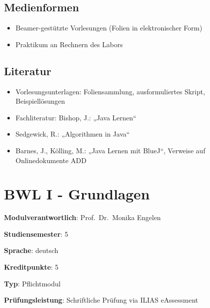 \hypertarget{medienformenpathlabelmi-2017modulbeschreibungen-bachelorba_algorithmenundprogrammierung2}{%
\section*{Medienformen\label{/mi-2017/modulbeschreibungen-bachelor/BA_AlgorithmenundProgrammierung2}}\label{medienformenpathlabelmi-2017modulbeschreibungen-bachelorba_algorithmenundprogrammierung2}}

\begin{itemize}
\tightlist
\item
  Beamer-gestützte Vorlesungen (Folien in elektronischer Form)
\item
  Praktikum an Rechnern des Labors
\end{itemize}

\hypertarget{literaturpathlabelmi-2017modulbeschreibungen-bachelorba_algorithmenundprogrammierung2}{%
\section*{Literatur\label{/mi-2017/modulbeschreibungen-bachelor/BA_AlgorithmenundProgrammierung2}}\label{literaturpathlabelmi-2017modulbeschreibungen-bachelorba_algorithmenundprogrammierung2}}

\begin{itemize}
\tightlist
\item
  Vorlesungsunterlagen: Foliensammlung, ausformuliertes Skript,
  Beispiellösungen
\item
  Fachliteratur: Bishop, J.: „Java Lernen``
\item
  Sedgewick, R.: „Algorithmen in Java``
\item
  Barnes, J., Kölling, M.: „Java Lernen mit BlueJ``, Verweise auf
  Onlinedokumente ADD
\end{itemize}

\hypertarget{bwl-i---grundlagenpathlabelmi-2017modulbeschreibungen-bachelorba_bwl1}{%
\chapter{BWL I -
Grundlagen\label{/mi-2017/modulbeschreibungen-bachelor/BA_BWL1}}\label{bwl-i---grundlagenpathlabelmi-2017modulbeschreibungen-bachelorba_bwl1}}

\begin{modulHead}
\textbf{Modulverantwortlich}: Prof.~Dr.~Monika
Engelen
\end{modulHead}
\begin{modulHead}
\textbf{Studiensemester}:
5
\end{modulHead}
\begin{modulHead}
\textbf{Sprache}:
deutsch
\end{modulHead}
\begin{modulHead}
\textbf{Kreditpunkte}:
5
\end{modulHead}
\begin{modulHead}
\textbf{Typ}:
Pflichtmodul
\end{modulHead}
\begin{modulHead}
\textbf{Prüfungsleistung}:
Schriftliche Prüfung via ILIAS eAssessment
\end{modulHead}



